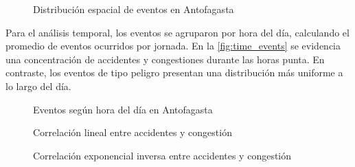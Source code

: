 \documentclass[12pt]{article}
\begin{document}
\begin{figure}[H]
    \centering
    \caption{Distribución espacial de eventos en Antofagasta}
    \label{fig:dist_events}
\end{figure}

Para el análisis temporal, los eventos se agruparon por hora del día, calculando el promedio de eventos ocurridos por jornada. En la \autoref{fig:time_events} se evidencia una concentración de accidentes y congestiones durante las horas punta. En contraste, los eventos de tipo peligro presentan una distribución más uniforme a lo largo del día.

\begin{figure}[H]
    \centering
    \newline
    \newline
    \newline
    \caption{Eventos según hora del día en Antofagasta}
    \label{fig:time_events}
\end{figure}



\begin{figure}[H]
    \centering
    \newline
    \newline
    \caption{Correlación lineal entre accidentes y congestión}
    \label{fig:corr_lineal}
\end{figure}


\begin{figure}[H]
    \centering
    \newline
    \newline
    \caption{Correlación exponencial inversa entre accidentes y congestión}
    \label{fig:corr_exp}
\end{figure}
\end{document}

